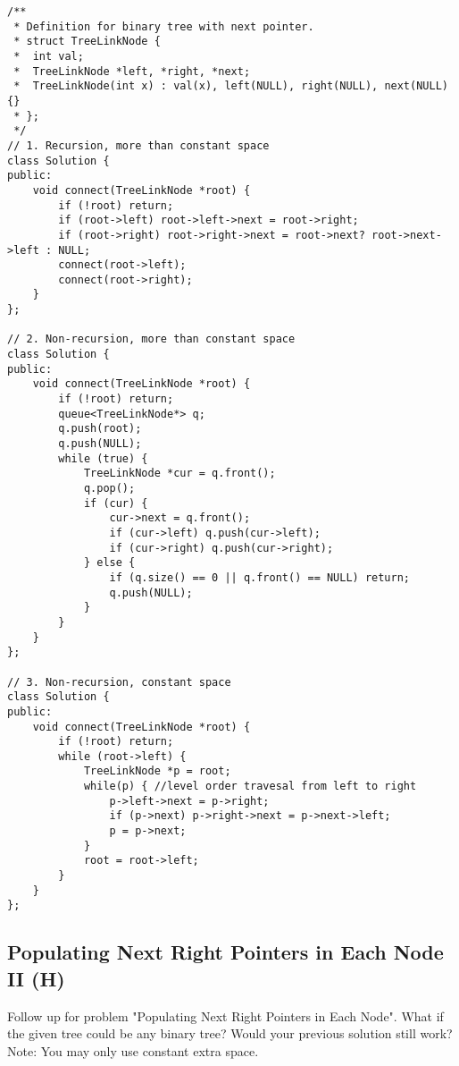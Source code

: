 \begin{lstlisting}
/**
 * Definition for binary tree with next pointer.
 * struct TreeLinkNode {
 *  int val;
 *  TreeLinkNode *left, *right, *next;
 *  TreeLinkNode(int x) : val(x), left(NULL), right(NULL), next(NULL) {}
 * };
 */
// 1. Recursion, more than constant space
class Solution {
public:
    void connect(TreeLinkNode *root) {
        if (!root) return;
        if (root->left) root->left->next = root->right;
        if (root->right) root->right->next = root->next? root->next->left : NULL;
        connect(root->left);
        connect(root->right);
    }
};

// 2. Non-recursion, more than constant space
class Solution {
public:
    void connect(TreeLinkNode *root) {
        if (!root) return;
        queue<TreeLinkNode*> q;
        q.push(root);
        q.push(NULL);
        while (true) {
            TreeLinkNode *cur = q.front();
            q.pop();
            if (cur) {
                cur->next = q.front();
                if (cur->left) q.push(cur->left);
                if (cur->right) q.push(cur->right);
            } else {
                if (q.size() == 0 || q.front() == NULL) return;
                q.push(NULL);
            }
        }
    }
};

// 3. Non-recursion, constant space
class Solution {
public:
    void connect(TreeLinkNode *root) {
        if (!root) return;
        while (root->left) {
            TreeLinkNode *p = root;
            while(p) { //level order travesal from left to right
                p->left->next = p->right;
                if (p->next) p->right->next = p->next->left;
                p = p->next;
            }
            root = root->left;
        }
    }    
};
\end{lstlisting}


\subsection{Populating Next Right Pointers in Each Node II (H)}
Follow up for problem "Populating Next Right Pointers in Each Node". What if the given tree could be any binary tree? Would your previous solution still work?\\

Note: You may only use constant extra space.\\

